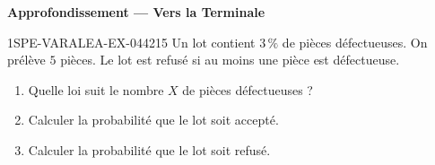 \begin{center}\textbf{Approfondissement — Vers la Terminale}\end{center}
\begin{exercice}{1SPE-VARALEA-EX-044}{2}{15}
Un lot contient $3\,\%$ de pièces défectueuses. On prélève $5$ pièces. Le lot est refusé si au moins une pièce est défectueuse.

\begin{enumerate}
  \item Quelle loi suit le nombre $X$ de pièces défectueuses ?
  \item Calculer la probabilité que le lot soit accepté.
  \item Calculer la probabilité que le lot soit refusé.
\end{enumerate}
\end{exercice}
